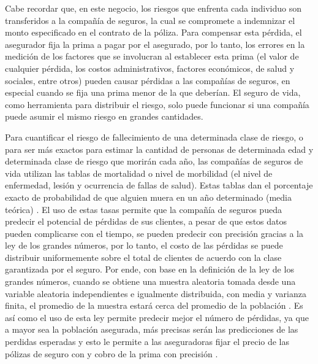 \documentclass{article}
\begin{document}
Cabe recordar que, en este negocio, los riesgos que enfrenta cada individuo son transferidos a la compañía de seguros, la cual se compromete a indemnizar el monto especificado en el contrato de la póliza. Para compensar esta pérdida, el asegurador fija la prima a pagar por el asegurado, por lo tanto, los errores en la medición de los factores que se involucran al establecer esta prima (el valor de cualquier pérdida, los costos administrativos, factores económicos, de salud y sociales, entre otros) pueden causar pérdidas a las compañías de seguros, en especial cuando se fija una prima menor de la que deberían. El seguro de vida, como herramienta para distribuir el riesgo, solo puede funcionar si una compañía puede asumir el mismo riesgo en grandes cantidades.

Para cuantificar el riesgo de fallecimiento de una determinada clase de riesgo, o para ser más exactos para estimar la cantidad de personas de determinada edad y determinada clase de riesgo que morirán cada año, las compañías de seguros de vida utilizan las tablas de mortalidad o nivel de morbilidad (el nivel de enfermedad, lesión y ocurrencia de fallas de salud). Estas tablas dan el porcentaje exacto de probabilidad de que alguien muera en un año determinado (media teórica) \cite{Lifeant}. El uso de estas tasas permite que la compañía de seguros pueda predecir el potencial de pérdidas de sus clientes, a pesar de que estos datos pueden complicarse con el tiempo, se pueden predecir con precisión gracias a la ley de los grandes números, por lo tanto, el costo de las pérdidas se puede distribuir uniformemente sobre el total de clientes de acuerdo con la clase garantizada por el seguro. Por ende, con base en la definición de la ley de los grandes números, cuando se obtiene una muestra aleatoria tomada desde una variable aleatoria independientes e igualmente distribuida, con media y varianza finita, el promedio de la muestra estará cerca del promedio de la población \cite{Tinungki}. Es así como el uso de esta ley permite predecir mejor el número de pérdidas, ya que a mayor sea la población asegurada, más precisas serán las predicciones de las perdidas esperadas y esto le permite a las aseguradoras fijar el precio de las pólizas de seguro con y cobro de la prima con precisión \cite{smith}.
\end{document}
